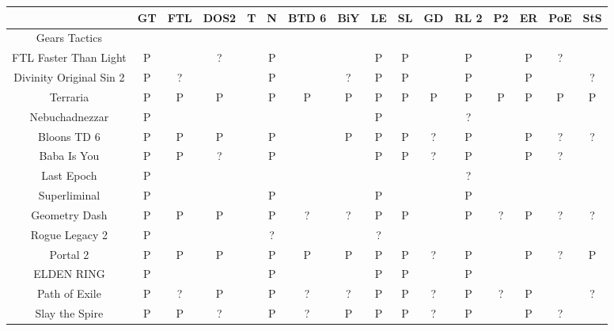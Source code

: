 \documentclass{article}
\begin{document}
\begin{enumerate}
    \begin{center}
    \begin{table}[!ht]
        \begin{tabular}{c|c|c|c|c|c|c|c|c|c|c|c|c|c|c|c}
            ~ & GT & FTL & DOS2 & T & N & BTD 6 & BiY & LE & SL & GD & RL 2 & P2 & ER & PoE & StS \\
            \hline
            \hline
            Gears Tactics & ~ & ~ & ~ & ~ & ~ & ~ & ~ & ~ & ~ & ~ & ~ & ~ & ~ & ~ & ~ \\ \hline
            FTL Faster Than Light & P & ~ & ? & ~ & P & ~ & ~ & P & P & ~ & P & ~ & P & ? & ~ \\ \hline
            Divinity Original Sin 2 & P & ? & ~ & ~ & P & ~ & ? & P & P & ~ & P & ~ & P & ~ & ? \\ \hline
            Terraria & P & P & P & ~ & P & P & P & P & P & P & P & P & P & P & P \\ \hline
            Nebuchadnezzar & P & ~ & ~ & ~ & ~ & ~ & ~ & P & ~ & ~ & ? & ~ & ~ & ~ & ~ \\ \hline
            Bloons TD 6 & P & P & P & ~ & P & ~ & P & P & P & ? & P & ~ & P & ? & ? \\ \hline
            Baba Is You & P & P & ? & ~ & P & ~ & ~ & P & P & ? & P & ~ & P & ? & ~ \\ \hline
            Last Epoch & P & ~ & ~ & ~ & ~ & ~ & ~ & ~ & ~ & ~ & ? & ~ & ~ & ~ & ~ \\ \hline
            Superliminal & P & ~ & ~ & ~ & P & ~ & ~ & P & ~ & ~ & P & ~ & ~ & ~ & ~ \\ \hline
            Geometry Dash & P & P & P & ~ & P & ? & ? & P & P & ~ & P & ? & P & ? & ? \\ \hline
            Rogue Legacy 2 & P & ~ & ~ & ~ & ? & ~ & ~ & ? & ~ & ~ & ~ & ~ & ~ & ~ & ~ \\ \hline
            Portal 2 & P & P & P & ~ & P & P & P & P & P & ? & P & ~ & P & ? & P \\ \hline
            ELDEN RING & P & ~ & ~ & ~ & P & ~ & ~ & P & P & ~ & P & ~ & ~ & ~ & ~ \\ \hline
            Path of Exile & P & ? & P & ~ & P & ? & ? & P & P & ? & P & ? & P & ~ & ? \\ \hline
            Slay the Spire & P & P & ? & ~ & P & ? & P & P & P & ? & P & ~ & P & ? & ~ \\
        \end{tabular}
    \end{table}
    \end{center}




\end{enumerate}
\end{document}
